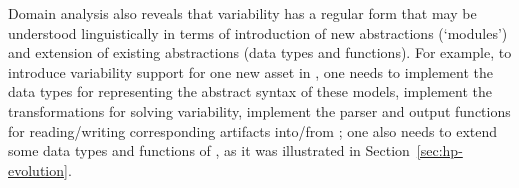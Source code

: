 Domain analysis also reveals that variability has a regular form that may be understood linguistically in terms of introduction of new abstractions (`modules') and extension of existing abstractions (data types and functions). For example, to introduce variability support for one new asset in \hp, one needs to implement the data types for representing the abstract syntax of these models, implement the transformations for solving variability, implement the parser and output functions for reading/writing corresponding artifacts into/from \hp; one also needs to extend some data types and functions of \hp{}, as it was illustrated in Section~\ref{sec:hp-evolution}.
